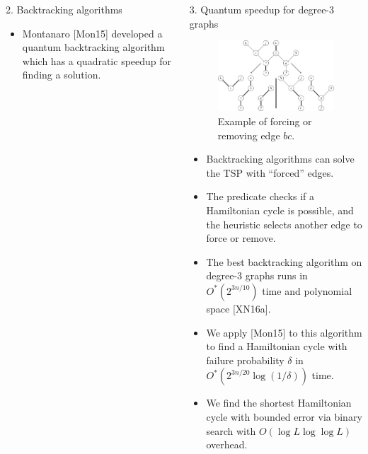 \documentclass[]{templates/poster}
\begin{document}
\begin{frame}{}
\begin{columns}[t]
\begin{column}{0.422\linewidth}
\begin{block}{\Large 2. Backtracking algorithms}
\begin{itemize}
  \item Montanaro [Mon15] developed a quantum backtracking algorithm which has a quadratic speedup for finding a solution.
  \end{itemize}
  \end{block}
  \end{column}

  \begin{column}{0.422\linewidth}
  \begin{block}{\Large 3. Quantum speedup for degree-3 graphs}
  \begin{figure}
  \includegraphics[width=\linewidth]{reduction}
  \caption{Example of forcing or removing edge $bc$.}
  \end{figure}
  \begin{itemize}
  \item Backtracking algorithms can solve the TSP with ``forced'' edges.
  
  \item The predicate checks if a Hamiltonian cycle is possible, and the heuristic selects another edge to force or remove.

  \item The best backtracking algorithm on degree-3 graphs runs in {\color{uobred} $O^*(2^{3n/10})$} time and polynomial space [XN16a].
  
  \item We apply [Mon15] to this algorithm to find a Hamiltonian cycle with failure probability $\delta$ in {\color{uobred}$O^*(2^{3n/20}\log(1/\delta))$} time.
  
  \item We find the shortest Hamiltonian cycle with bounded error via binary search with {\color{uobred}$O(\log L\log\log L)$} overhead.
  \end{itemize}
  \end{block}
  \end{column}
\end{columns}
  

\end{frame}
\end{document}
